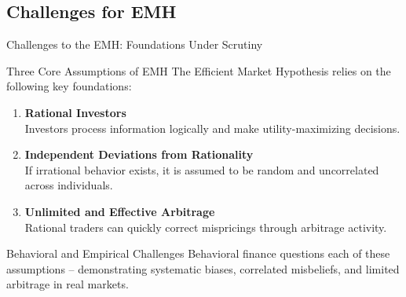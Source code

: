 \subsection{Challenges for EMH}
\begin{frame}{Challenges to the EMH: Foundations Under Scrutiny}
	\vspace{-5mm}
	\begin{block}{Three Core Assumptions of EMH}
		The Efficient Market Hypothesis relies on the following key foundations:
		\begin{enumerate}
			\item \textbf{Rational Investors} \\
			Investors process information logically and make utility-maximizing decisions.
			
			\item \textbf{Independent Deviations from Rationality} \\
			If irrational behavior exists, it is assumed to be random and uncorrelated across individuals.
			
			\item \textbf{Unlimited and Effective Arbitrage} \\
			Rational traders can quickly correct mispricings through arbitrage activity.
		\end{enumerate}
	\end{block}
	
	\begin{alertblock}{Behavioral and Empirical Challenges}
		\small
		Behavioral finance questions each of these assumptions -- demonstrating systematic biases, correlated misbeliefs, and limited arbitrage in real markets.
	\end{alertblock}
	
\end{frame}

